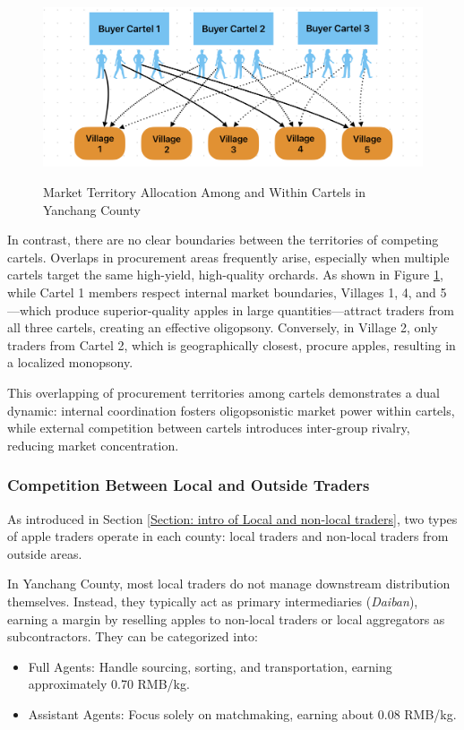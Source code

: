 \begin{figure}[hpt]
    \centering
        \caption{Market Territory Allocation Among and Within Cartels in Yanchang County}
    \includegraphics[width=\linewidth]{figures/Market_Territory.png}
    \label{fig: Market Territory}
\end{figure}

In contrast, there are no clear boundaries between the territories of competing cartels. Overlaps in procurement areas frequently arise, especially when multiple cartels target the same high-yield, high-quality orchards. As shown in Figure \ref{fig: Market Territory}, while Cartel 1 members respect internal market boundaries, Villages 1, 4, and 5—which produce superior-quality apples in large quantities—attract traders from all three cartels, creating an effective oligopsony. Conversely, in Village 2, only traders from Cartel 2, which is geographically closest, procure apples, resulting in a localized monopsony.

This overlapping of procurement territories among cartels demonstrates a dual dynamic: internal coordination fosters oligopsonistic market power within cartels, while external competition between cartels introduces inter-group rivalry, reducing market concentration. 



\subsubsection{Competition Between Local and Outside Traders}
\noindent 
As introduced in Section \ref{Section: intro of Local and non-local traders}, two types of apple traders operate in each county: local traders and non-local traders from outside areas.

In Yanchang County, most local traders do not manage downstream distribution themselves. Instead, they typically act as primary intermediaries (\textit{Daiban}), earning a margin by reselling apples to non-local traders or local aggregators as subcontractors. They can be categorized into:
\begin{itemize}
    \item Full Agents: Handle sourcing, sorting, and transportation, earning approximately 0.70 RMB/kg.
    \item Assistant Agents: Focus solely on matchmaking, earning about 0.08 RMB/kg.
\end{itemize}

